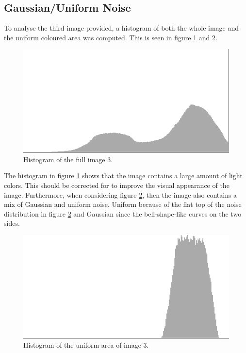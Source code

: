 

\subsection{Gaussian/Uniform Noise}
To analyse the third image provided, a histogram of both the whole image and the uniform coloured area was computed.
This is seen in figure \ref{fig:hist_pre_im03} and \ref{fig:hist_uni_im03}.


\begin{figure}[H]
\centering
\includegraphics[width= \histogramWidth]{../code/images/histogram_full_pre_03}
\caption{Histogram of the full image 3.}
\label{fig:hist_pre_im03}
\end{figure}

The histogram in figure \ref{fig:hist_pre_im03} shows that the image contains a large amount of light colors.
This should be corrected for to improve the visual appearance of the image.
Furthermore, when considering figure \ref{fig:hist_uni_im03}, then the image also contains a mix of Gaussian and uniform noise.
Uniform because of the flat top of the noise distribution in figure \ref{fig:hist_uni_im03} and Gaussian since the bell-shape-like curves on the two sides.


\begin{figure}[H]
\centering
\includegraphics[width= \histogramWidth]{../code/images/histogram_uniform_03}
\caption{Histogram of the uniform area of image 3.}
\label{fig:hist_uni_im03}
\end{figure}



